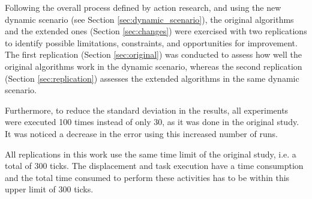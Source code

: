 Following the overall process defined by action research, and using the new dynamic scenario (see Section \ref{sec:dynamic_scenario}), the original algorithms and the extended ones (Section \ref{sec:changes}) were exercised with two replications to identify possible limitations, constraints, and opportunities for improvement. The first replication (Section \ref{sec:original}) was conducted to assess how well the original algorithms work in the dynamic scenario, whereas the second replication (Section \ref{sec:replication}) assesses the extended algorithms in the same dynamic scenario.

Furthermore, to reduce the standard deviation in the results, all experiments were executed 100 times instead of only 30, as it was done in the original study. It was noticed a decrease in the error using this increased number of runs.

All replications in this work use the same time limit of the original study, i.e. a total of 300 ticks. The displacement and task execution have a time consumption and the total time consumed to perform these activities has to be within this upper limit of 300 ticks.


